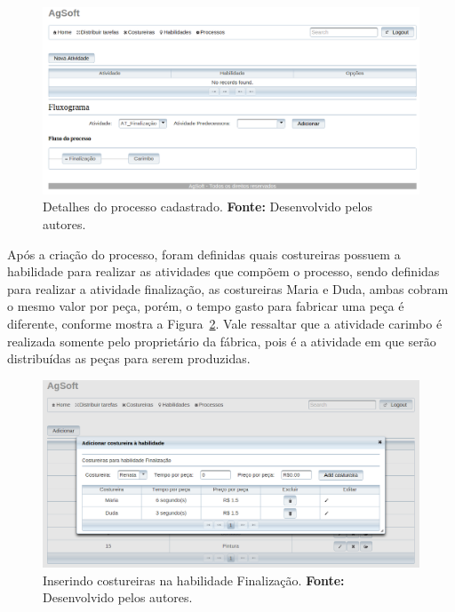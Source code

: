\begin{figure}[h!]
	\centerline{\includegraphics[width=13cm]{./imagens/tela_processo_teste1.png}}
	\caption[Detalhes do processo cadastrado.]
	{Detalhes do processo cadastrado. \textbf{Fonte:} Desenvolvido pelos autores.}
	\label{fig:processo_cadastrado}
\end{figure}

\par Após a criação do processo, foram definidas quais costureiras possuem a
habilidade para realizar as atividades que compõem o processo, sendo definidas
para realizar a atividade finalização, as costureiras Maria e Duda, ambas cobram o 
mesmo valor por peça, porém, o tempo gasto para fabricar uma peça é diferente, 
conforme mostra a Figura~\ref{fig:costureira_habilidade}. Vale ressaltar que
a atividade carimbo é realizada somente pelo proprietário da fábrica, pois é a
atividade em que serão distribuídas as peças para serem produzidas. 


\begin{figure}[h!]
	\centerline{\includegraphics[width=14.7cm]{./imagens/tela_habilidade_teste1.png}}
	\caption[Inserindo costureiras na habilidade Finalização.]
	{Inserindo costureiras na habilidade Finalização. \textbf{Fonte:} Desenvolvido
	pelos autores.}
	\label{fig:costureira_habilidade}
\end{figure}


